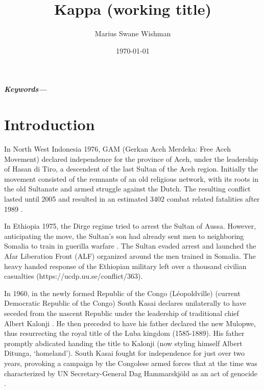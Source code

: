 \documentclass[12pt]{article}
\title{Kappa (working title)}
\author[1]{Marius Swane Wishman}
\affil[1]{Department of Sociology and Political Science, NTNU}
\date{\today}
\providecommand{\keywords}[1]
{
	\small	
	\textbf{\textit{Keywords---}} #1
}
\begin{document}
\maketitle



\begin{abstract}
\end{abstract}

\keywords{}

\pagebreak


\onehalfspacing


\section{Introduction}

In North West Indonesia 1976, GAM (Gerkan Aceh Merdeka: Free Aceh Movement)
declared independence for the province of Aceh, under the leadership of Hasan di
Tiro, a descendent of the last Sultan of the Aceh region. Initially the movement
consisted of the remnants of an old religious network, with its roots in the old
Sultanate and armed struggle against the Dutch. The resulting
conflict lasted until 2005 and resulted in an estimated 3402 combat related
fatalities after 1989 \citep{Aspinall2009, Pettersson2018, Sundberg2013}.

In Ethiopia 1975, the Dirge regime tried to arrest the Sultan of Aussa. However,
anticipating the move, the Sultan's son had already sent men to neighboring
Somalia to train in guerilla warfare \citep{Shehim1985}. The Sultan evaded
arrest and launched the Afar Liberation Front (ALF) organized around the men
trained in Somalia. The heavy handed response of the Ethiopian military left
over a thousand civilian casualties (https://ucdp.uu.se/conflict/363).

In 1960, in the newly formed Republic of the Congo (Léopoldville) (current
Democratic Republic of the Congo) South Kasai declares unilaterally to have
seceded from the nascent Republic under the leadership of traditional chief
Albert Kalonji \citep{Nzongola2002}. He then preceded to have his father
declared the new Mulopwe, thus resurrecting the royal title of the Luba kingdom
(1585-1889). His father promptly abdicated handing the title to Kalonji (now
styling himself Albert Ditunga, `homeland'). South Kasai fought for independence
for just over two years, provoking a campaign by the Congolese armed forces that
at the time was characterized by UN Secretary-General Dag Hammarskjöld as an act
of genocide \citep{Nzongola2002}.
\end{document}
